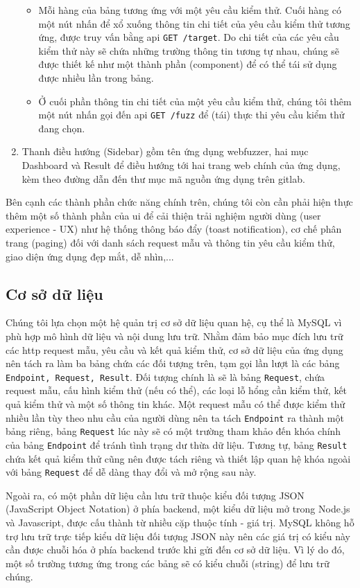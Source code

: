 \begin{enumerate}
\begin{itemize}
        \item Mỗi hàng của bảng tương ứng với một yêu cầu kiểm thử. Cuối hàng có một nút nhấn để xổ xuống thông tin chi tiết của yêu cầu kiểm thử tương ứng, được truy vấn bằng \acrshort{api} \colorbox{gray!30}{\texttt{GET /target}}. Do chi tiết của các yêu cầu kiểm thử này sẽ chứa những trường thông tin tương tự nhau, chúng sẽ được thiết kế như một thành phần (component) để có thể tái sử dụng được nhiều lần trong bảng.
        \item Ở cuối phần thông tin chi tiết của một yêu cầu kiểm thử, chúng tôi thêm một nút nhấn gọi đến \acrshort{api} \colorbox{gray!30}{\texttt{GET /fuzz}} để (tái) thực thi yêu cầu kiểm thử đang chọn.
    \end{itemize}
    \item Thanh điều hướng (Sidebar) gồm tên ứng dụng webfuzzer, hai mục Dashboard và Result để điều hướng tới hai trang web chính của ứng dụng, kèm theo đường dẫn đến thư mục mã nguồn ứng dụng trên gitlab.
\end{enumerate}
Bên cạnh các thành phần chức năng chính trên, chúng tôi còn cần phải hiện thực thêm một số thành phần của \acrshort{ui} để cải thiện trải nghiệm người dùng (user experience - UX) như hệ thống thông báo đẩy (toast notification), cơ chế phân trang (paging) đối với danh sách request mẫu và thông tin yêu cầu kiểm thử, giao diện ứng dụng đẹp mắt, dễ nhìn,...
\subsection{Cơ sở dữ liệu}
Chúng tôi lựa chọn một hệ quản trị cơ sở dữ liệu quan hệ, cụ thể là MySQL vì phù hợp mô hình dữ liệu và nội dung lưu trữ. Nhằm đảm bảo mục đích lưu trữ các \acrshort{http} request mẫu, yêu cầu và kết quả kiểm thử, cơ sở dữ liệu của ứng dụng nên tách ra làm ba bảng chứa các đối tượng trên, tạm gọi lần lượt là các bảng \texttt{Endpoint, Request, Result}. Đối tượng chính là sẽ là bảng \texttt{Request}, chứa request mẫu, cấu hình kiểm thử (nếu có thể), các loại lỗ hổng cần kiểm thử, kết quả kiểm thử và một số thông tin khác. Một request mẫu có thể được kiểm thử nhiều lần tùy theo nhu cầu của người dùng nên ta tách \texttt{Endpoint} ra thành một bảng riêng, bảng \texttt{Request} lúc này sẽ có một trường tham khảo đến khóa chính của bảng \texttt{Endpoint} để tránh tình trạng dư thừa dữ liệu. Tương tự, bảng \texttt{Result} chứa kết quả kiểm thử cũng nên được tách riêng và thiết lập quan hệ khóa ngoài với bảng \texttt{Request} để dễ dàng thay đổi và mở rộng sau này.\par
Ngoài ra, có một phần dữ liệu cần lưu trữ thuộc kiểu đối tượng JSON (JavaScript Object Notation) ở phía backend, một kiểu dữ liệu mở trong Node.js và Javascript, được cấu thành từ nhiều cặp thuộc tính - giá trị. MySQL không hỗ trợ lưu trữ trực tiếp kiểu dữ liệu đối tượng JSON này nên các giá trị có kiểu này cần được chuỗi hóa ở phía backend trước khi gửi đến cơ sở dữ liệu. Vì lý do đó, một số trường tương ứng trong các bảng sẽ có kiểu chuỗi (string) để lưu trữ chúng.